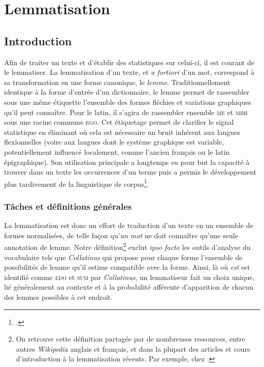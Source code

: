 \chapter{Lemmatisation}
\label{sec:lemmatiseurs}

\section{Introduction}
\label{subsec:lemma_intro}

Afin de traiter un texte et d'établir des statistiques sur celui-ci, il est courant de le lemmatiser. La lemmatisation d'un texte, et \textit{a fortiori} d'un mot, correspond à sa transformation en
une forme canonique, le \textit{lemme}. Traditionnellement identique à la forme d'entrée
d'un dictionnaire, le lemme permet de rassembler sous une même étiquette l'ensemble des formes fléchies et variations graphiques qu'il peut connaître. Pour le latin, il s'agira de rassembler ensemble \textsc{me} et \textsc{mihi} sous une racine commune \textsc{ego}. Cet étiquetage permet de clarifier le signal statistique en éliminant où cela est nécessaire un bruit inhérent aux langues flexionnelles (voire aux langues dont le système graphique est variable, potentiellement influencé localement, comme l'ancien français ou le latin épigraphique). Son utilisation principale a longtemps eu pour but la capacité à trouver dans un texte les occurrences d'un terme puis a permis le développement plus tardivement de la linguistique de corpus\footcite{mellet2002atouts}.

\subsection{Tâches et définitions générales}

La lemmatisation est donc un effort de traduction d'un texte en un ensemble de formes normalisées, de telle façon qu'\textit{un mot} ne doit connaître qu'une seule annotation de lemme. Notre définition\footnote{On retrouve cette définition partagée par de nombreuses ressources, entre autres \textit{Wikipedia} anglais et français, et dans la plupart des articles et cours d'introduction à la lemmatisation récents. Par exemple, chez \textcite{srinidhi_lemmatization_2020}: } exclut \textit{ipso facto} les outils d'analyse du vocabulaire tels que \textit{Collatinus} qui propose pour chaque forme l'ensemble de possibilités de lemme qu'il estime compatible avec la forme. Ainsi, là où \textit{est} est identifié comme \textsc{edo} et \textsc{sum} par \textit{Collatinus}, un lemmatiseur fait un choix unique, lié généralement au contexte et à la probabilité afférente d'apparition de chacun des lemmes possibles à cet endroit.

